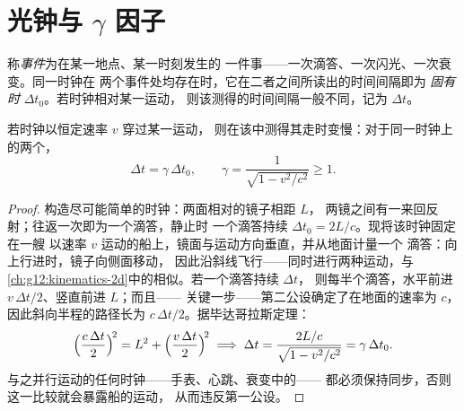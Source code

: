 \section{光钟与 $\gamma$ 因子}

\begin{definition}[事件，固有时]\label{def:g12:special-relativity:proper-time}
称\emph{事件}为在某一地点、某一时刻发生的
一件事——一次滴答、一次闪光、一次衰变。同一时钟在
两个事件处均存在时，它在二者之间所读出的时间间隔即为
\emph{固有时} $\Delta t_0$。若时钟相对某一运动，
则该测得的时间间隔一般不同，记为 $\Delta t$。
\end{definition}

\begin{theorem}[时间延缓]\label{thm:g12:special-relativity:dilation}
若时钟以恒定速率 $v$ 穿过某一运动，
则在该中测得其走时变慢：对于同一时钟上的两个，
\[
\Delta t = \gamma\, \Delta t_0, \qquad
\gamma = \frac{1}{\sqrt{1 - v^2/c^2}} \geq 1 .
\]
\end{theorem}

\begin{proof}
构造尽可能简单的时钟：两面相对的镜子相距 $L$，
两镜之间有一来回反射；往返一次即为一个滴答，静止时
一个滴答持续 $\Delta t_0 = 2L/c$。现将该时钟固定在一艘
以速率 $v$ 运动的船上，镜面与运动方向垂直，并从地面计量一个
滴答：向上行进时，镜子向侧面移动，
因此沿斜线飞行——同时进行两种运动，与
\cref{ch:g12:kinematics-2d}中的相似。若一个滴答持续 $\Delta t$，
则每半个滴答，水平前进 $v\,\Delta t/2$、竖直前进 $L$；而且——
关键一步——第二公设确定了在地面的速率为
$c$，因此斜向半程的路径长为 $c\,\Delta t/2$。据毕达哥拉斯定理：
\[
\Bigl(\frac{c\,\Delta t}{2}\Bigr)^{\!2} = L^2 + \Bigl(\frac{v\,\Delta t}{2}\Bigr)^{\!2}
\;\Longrightarrow\;
\Delta t = \frac{2L/c}{\sqrt{1 - v^2/c^2}} = \gamma\,\Delta t_0 .
\]
与之并行运动的任何时钟——手表、心跳、衰变中的——
都必须保持同步，否则这一比较就会暴露船的运动，
从而违反第一公设。
\end{proof}

